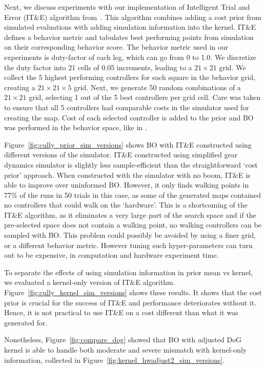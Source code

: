 Next, we discuss experiments with our implementation of Intelligent Trial and Error (IT\&E) algorithm from~\citet{cully2015robots}. This algorithm combines adding a cost prior from simulated evaluations with adding simulation information into the kernel. IT\&E defines a behavior metric and tabulates best performing points from simulation on their corresponding behavior score. The behavior metric used in our experiments is duty-factor of each leg, which can go from 0 to 1.0. We discretize the duty factor into 21 cells of 0.05 increments, leading to a $21\times21$ grid. We collect the 5 highest performing controllers for each square in the behavior grid, creating a $21\times21\times5$ grid. Next, we generate 50 random combinations of a $21\times21$ grid, selecting 1 out of the 5 best controllers per grid cell. Care was taken to ensure that all 5 controllers had comparable costs in the simulator used for creating the map. 
Cost of each selected controller is added to the prior and BO was performed in the behavior space, like in \cite{cully2015robots}.

Figure~\ref{fig:cully_prior_sim_versions} shows BO with IT\&E constructed using different versions of the simulator. \mbox{IT\&E} constructed using simplified gear dynamics simulator is slightly less sample-efficient than the straightforward `cost prior' approach. When constructed with the simulator with no boom, \mbox{IT\&E} is able to improve over uninformed BO. However, it only finds walking points in 77\% of the runs in 50 trials in  this case, as some of the generated maps contained no controllers that could walk on the `hardware'. This is a shortcoming of the IT\&E algorithm, as it eliminates a very large part of the search space and if the pre-selected space does not contain a walking point, no walking controllers can be sampled with BO. This problem could possibly be avoided by using a finer grid, or a different behavior metric. However tuning such hyper-parameters can turn out to be expensive, in computation and hardware experiment time.
 


To separate the effects of using simulation information in prior mean vs kernel, we evaluated a kernel-only version of \mbox{IT\&E} algorithm. Figure~\ref{fig:cully_kernel_sim_versions} shows these results. It shows that the cost prior is crucial for the success of IT\&E and performance deteriorates without it. Hence, it is not practical to use IT\&E on a cost different than what it was generated for.

Nonetheless, Figure~\ref{fig:compare_dog} showed that BO with adjusted DoG kernel is able to handle both moderate and severe mismatch with kernel-only information, collected in  Figure~\ref{fig:kernel_hwadjust2_sim_versions}.

